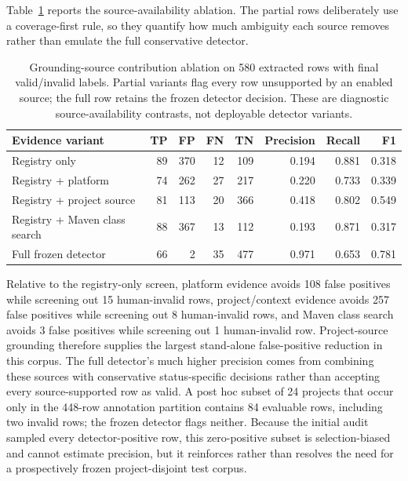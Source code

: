 \documentclass[pdflatex,sn-basic]{sn-jnl}
\begin{document}
Table~\ref{tab:grounding-ablation} reports the source-availability ablation. The partial rows deliberately use a coverage-first rule, so they quantify how much ambiguity each source removes rather than emulate the full conservative detector.

\begin{table}[htbp]
\caption{Grounding-source contribution ablation on 580 extracted rows with final valid/invalid labels. Partial variants flag every row unsupported by an enabled source; the full row retains the frozen detector decision. These are diagnostic source-availability contrasts, not deployable detector variants.}
\label{tab:grounding-ablation}
{\footnotesize
\setlength{\tabcolsep}{2.5pt}
\begin{tabular}{@{}lrrrrrrr@{}}
\toprule
Evidence variant & TP & FP & FN & TN & Precision & Recall & F1 \\
\midrule
Registry only & 89 & 370 & 12 & 109 & 0.194 & 0.881 & 0.318 \\
Registry + platform & 74 & 262 & 27 & 217 & 0.220 & 0.733 & 0.339 \\
Registry + project source & 81 & 113 & 20 & 366 & 0.418 & 0.802 & 0.549 \\
Registry + Maven class search & 88 & 367 & 13 & 112 & 0.193 & 0.871 & 0.317 \\
Full frozen detector & 66 & 2 & 35 & 477 & 0.971 & 0.653 & 0.781 \\
\bottomrule
\end{tabular}
}
\end{table}

Relative to the registry-only screen, platform evidence avoids 108 false positives while screening out 15 human-invalid rows, project/context evidence avoids 257 false positives while screening out 8 human-invalid rows, and Maven class search avoids 3 false positives while screening out 1 human-invalid row. Project-source grounding therefore supplies the largest stand-alone false-positive reduction in this corpus. The full detector's much higher precision comes from combining these sources with conservative status-specific decisions rather than accepting every source-supported row as valid. A post hoc subset of 24 projects that occur only in the 448-row annotation partition contains 84 evaluable rows, including two invalid rows; the frozen detector flags neither. Because the initial audit sampled every detector-positive row, this zero-positive subset is selection-biased and cannot estimate precision, but it reinforces rather than resolves the need for a prospectively frozen project-disjoint test corpus.
\end{document}
